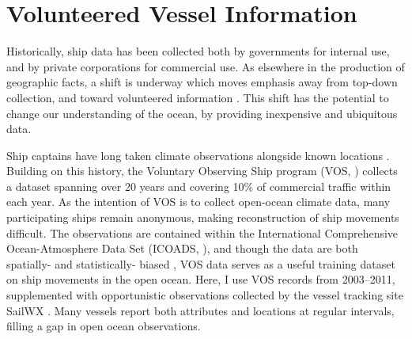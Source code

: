 \section{Volunteered Vessel Information}


Historically, ship data has been collected both by governments for internal use, and by private corporations for commercial use. As elsewhere in the production of geographic facts, a shift is underway which moves emphasis away from top-down collection, and toward volunteered information \citep{goodchild2007citizens,elwood2011researching}. This shift has the potential to change our understanding of the ocean, by providing inexpensive and ubiquitous data.

Ship captains have long taken climate observations alongside known locations \citep{brohan2009marine}.  Building on this history, the Voluntary Observing Ship program (VOS, \citealp{VOSOverview}) collects a dataset spanning over 20 years and covering 10\% of commercial traffic within each year. As the intention of VOS is to collect open-ocean climate data, many participating ships remain anonymous, making reconstruction of ship movements difficult.  The observations are contained within the International Comprehensive Ocean-Atmosphere Data Set (ICOADS, \citealp{woodruff2010icoads}), and though the data are both spatially- and statistically- biased \citep{Wang2007}, VOS data serves as a useful training dataset on ship movements in the open ocean. Here, I use VOS records from 2003--2011, supplemented with opportunistic observations collected by the vessel tracking site SailWX \citep{SAILWX}. Many vessels report both attributes and locations at regular intervals, filling a gap in open ocean observations.

